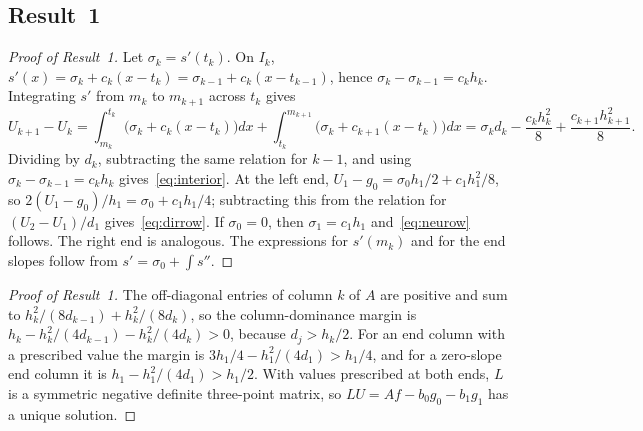 \documentclass[11pt]{article}
\begin{document}
\subsection*{Result~1}
\begin{proof}[Proof of Result~1]
Let $\sigma_k=s'(t_k)$. On $I_k$, $s'(x)=\sigma_k+c_k(x-t_k)=\sigma_{k-1}+c_k(x-t_{k-1})$, hence
$\sigma_k-\sigma_{k-1}=c_kh_k$. Integrating $s'$ from $m_k$ to $m_{k+1}$ across $t_k$ gives
\[
U_{k+1}-U_k=\int_{m_k}^{t_k}\!\big(\sigma_k+c_k(x-t_k)\big)dx+\int_{t_k}^{m_{k+1}}\!\big(\sigma_k+c_{k+1}(x-t_k)\big)dx
=\sigma_kd_k-\frac{c_kh_k^2}{8}+\frac{c_{k+1}h_{k+1}^2}{8}.
\]
Dividing by $d_k$, subtracting the same relation for $k-1$, and using $\sigma_k-\sigma_{k-1}=c_kh_k$
gives~\eqref{eq:interior}. At the left end, $U_1-g_0=\sigma_0h_1/2+c_1h_1^2/8$, so
$2(U_1-g_0)/h_1=\sigma_0+c_1h_1/4$; subtracting this from the relation for $(U_2-U_1)/d_1$
gives~\eqref{eq:dirrow}. If $\sigma_0=0$, then $\sigma_1=c_1h_1$ and~\eqref{eq:neurow} follows. The right
end is analogous. The expressions for $s'(m_k)$ and for the end slopes follow from $s'=\sigma_0+\int s''$.
\end{proof}
\begin{proof}[Proof of Result~1]
The off-diagonal entries of column $k$ of $A$ are positive and sum to $h_k^2/(8d_{k-1})+h_k^2/(8d_k)$, so
the column-dominance margin is $h_k-h_k^2/(4d_{k-1})-h_k^2/(4d_k)>0$, because $d_j>h_k/2$. For an end
column with a prescribed value the margin is $3h_1/4-h_1^2/(4d_1)>h_1/4$, and for a zero-slope end
column it is $h_1-h_1^2/(4d_1)>h_1/2$. With values prescribed at both ends, $L$ is a symmetric negative
definite three-point matrix, so $LU=Af-b_0g_0-b_1g_1$ has a unique solution.
\end{proof}
\end{document}
